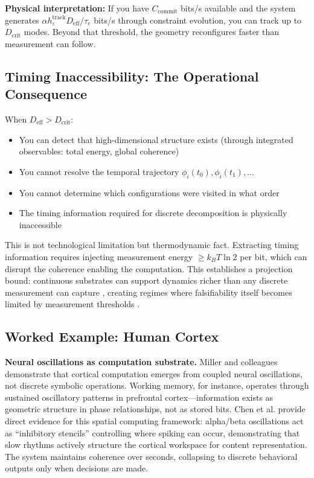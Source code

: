 \documentclass[12pt]{article}
\begin{document}
\textbf{Physical interpretation:} If you have $C_{\text{commit}}$ bits/s available and the system generates $\alpha h_\varepsilon^{\text{track}} D_{\text{eff}}/\tau_e$ bits/s through constraint evolution, you can track up to $D_{\text{crit}}$ modes. Beyond that threshold, the geometry reconfigures faster than measurement can follow.

\subsection{Timing Inaccessibility: The Operational Consequence}

When $D_{\text{eff}} > D_{\text{crit}}$:

\begin{itemize}
\item You can detect that high-dimensional structure exists (through integrated observables: total energy, global coherence)
\item You cannot resolve the temporal trajectory $\phi_i(t_0), \phi_i(t_1), \ldots$
\item You cannot determine which configurations were visited in what order
\item The timing information required for discrete decomposition is physically inaccessible
\end{itemize}

This is not technological limitation but thermodynamic fact. Extracting timing information requires injecting measurement energy $\geq k_B T \ln 2$ per bit, which can disrupt the coherence enabling the computation. This establishes a projection bound: continuous substrates can support dynamics richer than any discrete measurement can capture \cite{todd2025maxwell}, creating regimes where falsifiability itself becomes limited by measurement thresholds \cite{todd2025falsifiability}.

\subsection{Worked Example: Human Cortex}

\textbf{Neural oscillations as computation substrate.} Miller and colleagues demonstrate that cortical computation emerges from coupled neural oscillations, not discrete symbolic operations. Working memory, for instance, operates through sustained oscillatory patterns in prefrontal cortex—information exists as geometric structure in phase relationships, not as stored bits. Chen et al. \cite{chen2026} provide direct evidence for this spatial computing framework: alpha/beta oscillations act as ``inhibitory stencils'' controlling where spiking can occur, demonstrating that slow rhythms actively structure the cortical workspace for content representation. The system maintains coherence over seconds, collapsing to discrete behavioral outputs only when decisions are made.
\end{document}

